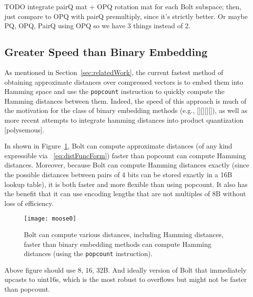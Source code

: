 TODO integrate pairQ mat + OPQ rotation mat for each Bolt subspace; then, just compare to OPQ with pairQ premultiply, since it's strictly better. Or maybe PQ, OPQ, PairQ using OPQ so we have 3 things instead of 2.


\subsection{Greater Speed than Binary Embedding}

As mentioned in Section~\ref{sec:relatedWork}, the current fastest method of obtaining approximate distances over compressed vectors is to embed them into Hamming space and use the \texttt{popcount} instruction to quickly compute the Hamming distances between them. Indeed, the speed of this approach is much of the motivation for the class of binary embedding methods (e.g., [][][][]), as well as more recent attempts to integrate hamming distances into product quantization [polysemous].

In shown in Figure~\ref{fig:bolt_vs_popcount}, Bolt can compute approximate distances (of any kind expressible via ~\ref{eq:distFuncForm}) faster than popcount can compute Hamming distances. Moreover, because Bolt can compute Hamming distances exactly (since the possible distances between pairs of 4 bits can be stored exactly in a 16B lookup table), it is both faster and more flexible than using popcount. It also has the benefit that it can use encoding lengths that are not multiples of 8B without loss of efficiency.

\begin{figure}[h]
\begin{center}
\label{fig:bolt_vs_popcount}
\texttt{[image: moose0]}
\vspace*{-1mm}
\caption{Bolt can compute various distances, including Hamming distances, faster than binary embedding methods can compute Hamming distances (using the \texttt{popcount} instruction).}
\end{center}
\end{figure}

Above figure should use 8, 16, 32B. And ideally version of Bolt that immediately upcasts to uint16s, which is the most robust to overflows but might not be faster than popcount.

